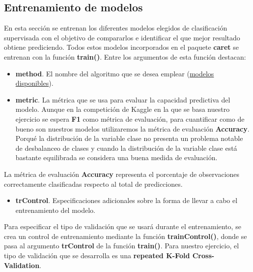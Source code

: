 \documentclass[]{article}
\providecommand{\tightlist}{%
  \setlength{\itemsep}{0pt}\setlength{\parskip}{0pt}}
\begin{document}
\hypertarget{entrenamiento-de-modelos}{%
\subsection{Entrenamiento de modelos}\label{entrenamiento-de-modelos}}

En esta sección se entrenan los diferentes modelos elegidos de clasificación
supervisada con el objetivo de compararlos e identificar el que mejor
resultado obtiene prediciendo. Todos estos modelos incorporados en el
paquete \textbf{caret} se entrenan con la función \textbf{train()}. Entre
los argumentos de esta función destacan:

\begin{itemize}
\item
  \textbf{method}. El nombre del algoritmo que se desea emplear
  (\href{http://topepo.github.io/caret/available-models.html}{\color{blue}modelos disponibles}).
\item
  \textbf{metric}. La métrica que se usa para evaluar la capacidad
  predictiva del modelo. Aunque en la competición de Kaggle en la que se
  basa nuestro ejercicio se espera \textbf{F1} como métrica de
  evaluación, para cuantificar como de bueno son nuestros modelos
  utilizaremos la métrica de evaluación \textbf{Accuracy}. Porqué la
  distribución de la variable clase no presenta un problema notable de
  desbalanceo de clases y cuando la distribución de la variable clase
  está bastante equilibrada se considera una buena medida de evaluación.
\end{itemize}

\begin{tcolorbox}
	La métrica de evaluación \textbf{Accuracy} representa el porcentaje de observaciones correctamente
	clasificadas respecto al total de predicciones.
\end{tcolorbox}

\begin{itemize}
\tightlist
\item
  \textbf{trControl}. Especificaciones adicionales sobre la forma de
  llevar a cabo el entrenamiento del modelo.
\end{itemize}

Para especificar el tipo de validación que se usará durante el entrenamiento, se crea un control de entrenamiento mediante la función \textbf{trainControl()}, donde se pasa al argumento \textbf{trControl} de la función \textbf{train()}. Para nuestro ejercicio, el tipo de validación que se desarrolla es una \textbf{repeated K-Fold Cross-Validation}. 
\end{document}

